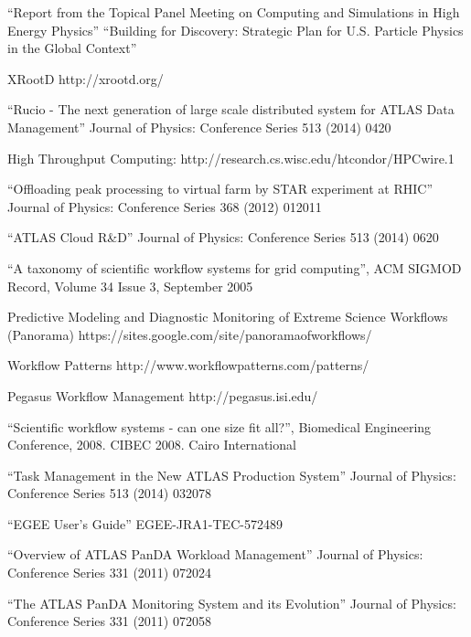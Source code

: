 \begin{thebibliography}{99}
 ``Report from the Topical Panel Meeting on Computing and
Simulations in High Energy Physics''
 ``Building for Discovery: Strategic Plan for U.S. Particle Physics in the Global Context''

 XRootD http://xrootd.org/

 ``Rucio - The next generation of large scale distributed system for ATLAS Data Management'' Journal of Physics: Conference Series 513 (2014) 0420


 High Throughput Computing: http://research.cs.wisc.edu/htcondor/HPCwire.1

 ``Offloading peak processing to virtual farm by STAR experiment at RHIC'' Journal of Physics: Conference Series 368 (2012) 012011

 ``ATLAS Cloud R\&D'' Journal of Physics: Conference Series 513 (2014) 0620

 ``A taxonomy of scientific workflow systems for grid computing'', ACM SIGMOD Record, Volume 34 Issue 3, September 2005

 Predictive Modeling and Diagnostic Monitoring of Extreme Science Workflows (Panorama) https://sites.google.com/site/panoramaofworkflows/

 Workflow Patterns http://www.workflowpatterns.com/patterns/

 Pegasus Workflow Management http://pegasus.isi.edu/

 ``Scientific workflow systems - can one size fit all?'', Biomedical Engineering Conference, 2008. CIBEC 2008. Cairo International

 ``Task Management in the New ATLAS Production System'' Journal of Physics: Conference Series 513 (2014) 032078

 ``EGEE User’s Guide'' EGEE-JRA1-TEC-572489

 ``Overview of ATLAS PanDA Workload Management'' Journal of Physics: Conference Series 331 (2011) 072024

 ``The ATLAS PanDA Monitoring System and its Evolution'' Journal of Physics: Conference Series 331 (2011) 072058


\end{thebibliography}
